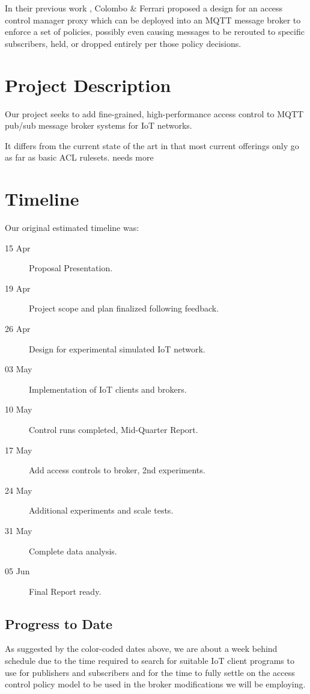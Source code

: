 \documentclass[sigconf, nonacm]{acmart}
\begin{document}
In their previous work \cite{colombo2018access}, Colombo \& Ferrari proposed a design for an access control manager proxy which can be deployed into an MQTT message broker to enforce
a set of policies, possibly even causing messages to be rerouted to specific subscribers, held, or dropped entirely per those policy decisions.


\section{Project Description}
Our project seeks to add fine-grained, high-performance access control to MQTT
pub/sub message broker systems for IoT networks.

It differs from the current state of the art in that most current offerings only go as far as basic
ACL rulesets.
{\color{red}needs more}

\section{Timeline}
Our original estimated timeline was:
\begin{description}
	\item[\color{ontrack}15 Apr] Proposal Presentation.
	\item[\color{ontrack}19 Apr] Project scope and plan finalized following feedback.
	\item[\color{ontrack}26 Apr] Design for experimental simulated IoT network.
	\item[\color{ontrack}03 May] Implementation of IoT clients and brokers.
	\item[\color{behind}10 May] Control runs completed, Mid-Quarter Report.
	\item[\color{behind}17 May] Add access controls to broker, 2nd experiments.
	\item[24 May] Additional experiments and scale tests.
	\item[31 May] Complete data analysis.
	\item[05 Jun] Final Report ready.
\end{description}
\subsection{Progress to Date}
As suggested by the color-coded dates above, we are about a week behind schedule due to the time
required to search for suitable IoT client programs to use for publishers and subscribers and for
the time to fully settle on the access control policy model to be used in the broker modifications
we will be employing. 
\end{document}
